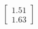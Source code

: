 \documentclass[preview]{standalone}
\begin{document}
\begin{align*}
\begin{bmatrix} 1.51 \\ 1.63 \end{bmatrix}
\end{align*}
\end{document}
